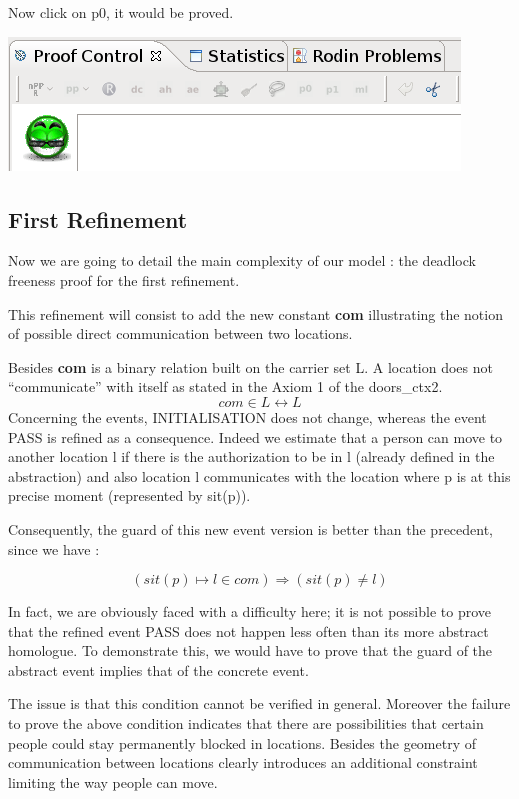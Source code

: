 Now click on p0, it would be proved.

\begin{center}
	\includegraphics[]{img/tutorial/tut_10_proved.png}
\end{center}

\subsection{First Refinement}

Now we are going to detail the main complexity of our model : the deadlock freeness proof for the first refinement. 

This refinement will consist to add the new constant \textbf{com} illustrating the notion of possible direct communication between two locations.

Besides \textbf{com} is a binary relation built on the carrier set L. A location does not “communicate” with itself as stated in the Axiom 1 of the doors\_ctx2.
\[
com \in L\leftrightarrow L
\]
Concerning the events, \textsf{INITIALISATION} does not change, whereas the event \textsf{PASS} is refined as a consequence. Indeed we estimate that a person can move to another location l if there is the authorization to be in l (already defined in the abstraction) and also location l communicates with the location where p is at this precise moment (represented by sit(p)).

Consequently, the guard of this new event version is better than the precedent, since we have :

\[
( sit(p) \mapsto l \in com ) \Rightarrow ( sit(p)\neq l )
\]

In fact, we are obviously faced with a difficulty here; it is not possible to prove that the refined event \textsf{PASS} does not happen less often than its more abstract homologue. To demonstrate this, we would have to prove that the guard of the abstract event implies that of the concrete event.

The issue is that this condition cannot be verified in general. Moreover the failure to prove the above condition indicates that there are possibilities that certain people could stay permanently blocked in locations. Besides the geometry of communication between locations clearly introduces an additional constraint limiting the way people can move.

